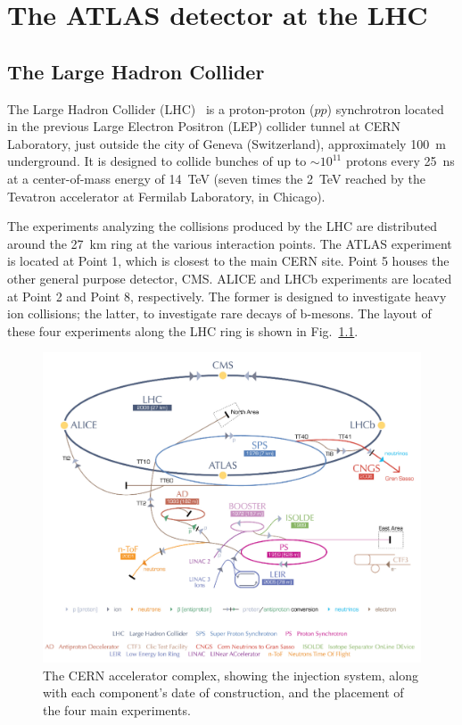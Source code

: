 
%
%
\chapter{The ATLAS detector at the LHC}

\section{The Large Hadron Collider}


The Large Hadron Collider  (LHC)~\cite{Breskin:1244506} is a proton-proton ($pp$) synchrotron located in the previous Large Electron Positron (LEP) collider tunnel at CERN Laboratory, just outside the city of Geneva (Switzerland), approximately 100~m underground. It is designed to collide bunches of up to $\sim 10^{11}$ protons every 25~ns at a center-of-mass energy of 14~TeV (seven times the 2~TeV reached by the Tevatron accelerator at Fermilab Laboratory, in Chicago). 

The experiments analyzing the collisions produced by the LHC are distributed around the 27~km ring at the various interaction points. The ATLAS experiment is located at Point 1, which is closest to the main CERN site. Point 5 houses the other general purpose detector, CMS. ALICE and LHCb experiments are located at Point 2 and Point 8, respectively. The former is designed to investigate heavy ion collisions; the latter, to investigate rare decays of b-mesons. The layout of these four experiments along the LHC ring is shown in Fig.~\ref{fig:LHC1}.

\begin{figure}[htbp]
  \begin{center}
      \includegraphics[width=1\textwidth]{Fig2/CERNacceleratorcomplexCut.pdf}
    \caption{The CERN accelerator complex, showing the injection system, along with each component’s date of construction, and the placement of the four main experiments.}
    \label{fig:LHC1}
  \end{center}
\end{figure}



